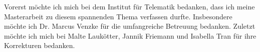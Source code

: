 Vorerst möchte ich mich bei dem Institut für Telematik bedanken, dass ich meine Masterarbeit zu diesem spannenden Thema verfassen durfte.
Insbesondere möchte ich Dr. Marcus Venzke für die umfangreiche Betreuung bedanken.
Zuletzt möchte ich mich bei Malte Laukötter, Jannik Friemann und Isabella Tran für ihre Korrekturen bedanken.

